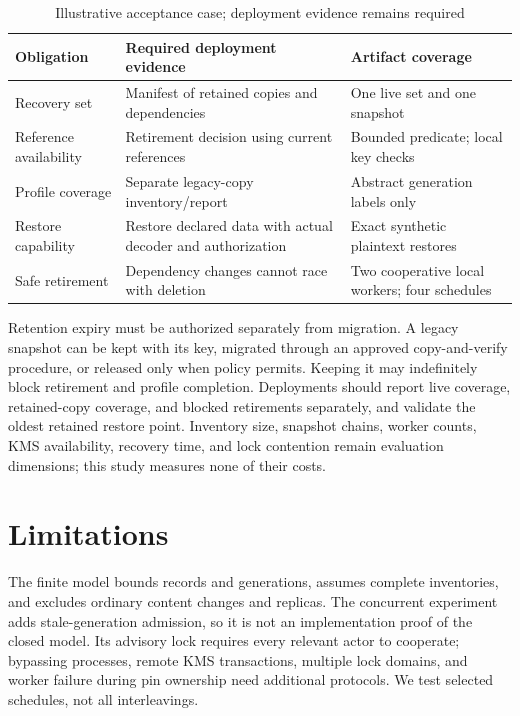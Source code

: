 \documentclass[10pt,conference]{IEEEtran}
\begin{document}
\begin{table}[t]
\caption{Illustrative acceptance case; deployment evidence remains required}
\label{tab:acceptance}\centering
\begin{tabular}{@{}p{1.8cm}p{3.1cm}p{2.9cm}@{}}
\toprule
Obligation & Required deployment evidence & Artifact coverage\\
\midrule
Recovery set & Manifest of retained copies and dependencies & One live set and one snapshot\\
Reference availability & Retirement decision using current references & Bounded predicate; local key checks\\
Profile coverage & Separate legacy-copy inventory/report & Abstract generation labels only\\
Restore capability & Restore declared data with actual decoder and authorization & Exact synthetic plaintext restores\\
Safe retirement & Dependency changes cannot race with deletion & Two cooperative local workers; four schedules\\
\bottomrule
\end{tabular}
\end{table}

Retention expiry must be authorized separately from migration. A legacy snapshot can be kept with its key, migrated through an approved copy-and-verify procedure, or released only when policy permits. Keeping it may indefinitely block retirement and profile completion. Deployments should report live coverage, retained-copy coverage, and blocked retirements separately, and validate the oldest retained restore point. Inventory size, snapshot chains, worker counts, KMS availability, recovery time, and lock contention remain evaluation dimensions; this study measures none of their costs.

\balance
\section{Limitations}
The finite model bounds records and generations, assumes complete inventories, and excludes ordinary content changes and replicas. The concurrent experiment adds stale-generation admission, so it is not an implementation proof of the closed model. Its advisory lock requires every relevant actor to cooperate; bypassing processes, remote KMS transactions, multiple lock domains, and worker failure during pin ownership need additional protocols. We test selected schedules, not all interleavings.
\end{document}
